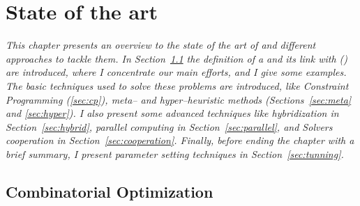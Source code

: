 \chapter{State of the art}
\label{chap:art}
\textit{This chapter presents an overview to the state of the art of \COPs{} and different approaches to tackle them. In Section~\ref{sec:combi} the definition of a \COP{} and its link with \CSPs{} (\csp) are introduced, where I concentrate our main efforts, and I give some examples. The basic techniques used to solve these problems are introduced, like {\it Constraint Programming} (\ref{sec:cp}), {\it meta-- and hyper--heuristic methods} (Sections~\ref{sec:meta} and \ref{sec:hyper}). I also present some advanced techniques like {\it hybridization} in Section~\ref{sec:hybrid}, {\it parallel computing} in Section~\ref{sec:parallel}, and {\it Solvers cooperation} in Section~\ref{sec:cooperation}. Finally, before ending the chapter with a brief summary,  I present {\it parameter setting techniques} in Section~\ref{sec:tunning}.}
\vfill
\minitoc
\newpage



\section{Combinatorial Optimization}
\label{sec:combi}

